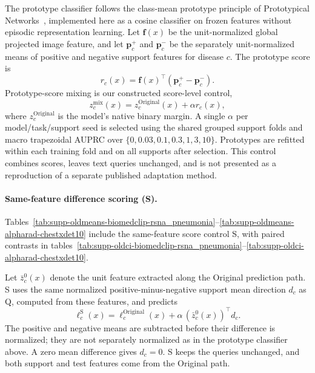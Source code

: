 The prototype classifier follows the class-mean prototype principle of Prototypical Networks~\cite{snell2017prototypical}, implemented here as a cosine classifier on frozen features without episodic representation learning. Let $\mathbf f(x)$ be the unit-normalized global projected image feature, and let $\mathbf p_c^+$ and $\mathbf p_c^-$ be the separately unit-normalized means of positive and negative support features for disease $c$. The prototype score is
\[
 r_c(x)=\mathbf f(x)^\top(\mathbf p_c^+-\mathbf p_c^-).
\]
Prototype-score mixing is our constructed score-level control,
\[
 z_c^{\mathrm{mix}}(x)=z_c^{\mathrm{Original}}(x)+\alpha r_c(x),
\]
where $z_c^{\mathrm{Original}}$ is the model's native binary margin. A single $\alpha$ per model/task/support seed is selected using the shared grouped support folds and macro trapezoidal AUPRC over $\{0,0.03,0.1,0.3,1,3,10\}$. Prototypes are refitted within each training fold and on all supports after selection. This control combines scores, leaves text queries unchanged, and is not presented as a reproduction of a separate published adaptation method.

\paragraph{Same-feature difference scoring (S).}
\label{supp:same_feature_score}
Tables~\ref{tab:supp-oldmeans-biomedclip-rsna_pneumonia}--\ref{tab:supp-oldmeans-alpharad-chestxdet10} include the same-feature score control S, with paired contrasts in tables~\ref{tab:supp-oldci-biomedclip-rsna_pneumonia}--\ref{tab:supp-oldci-alpharad-chestxdet10}.

Let $\bar z_c^0(x)$ denote the unit feature extracted along the Original prediction path. S uses the same normalized positive-minus-negative support mean direction $d_c$ as Q, computed from these features, and predicts
\begin{equation}
\ell_c^{\mathrm S}(x)=\ell_c^{\mathrm{Original}}(x)
+\alpha\,(\bar z_c^0(x))^\top d_c.
\label{eq:supp_same_feature_score}
\end{equation}
The positive and negative means are subtracted before their difference is normalized; they are not separately normalized as in the prototype classifier above. A zero mean difference gives $d_c=0$. S keeps the queries unchanged, and both support and test features come from the Original path.

